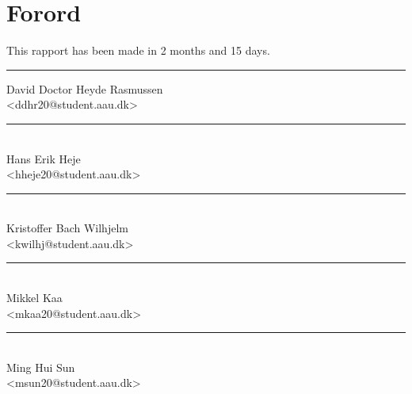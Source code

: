 \section*{Forord}%

This rapport has been made in 2 months and 15 days.

\vfill\noindent

\begin{center}
\begin{minipage}[b]{0.45\textwidth}
 \centering
 \rule{\textwidth}{0.5pt}
  David Doctor Heyde Rasmussen\\
 {\footnotesize <ddhr20@student.aau.dk>}
\end{minipage}
\end{center}

\begin{center}
\begin{minipage}[b]{0.45\textwidth}
 \centering
 \rule{\textwidth}{0.5pt}\\
  Hans Erik Heje\\
 {\footnotesize <hheje20@student.aau.dk>}
\end{minipage}
\hfill
\begin{minipage}[b]{0.45\textwidth}
 \centering
 \rule{\textwidth}{0.5pt}\\
  Kristoffer Bach Wilhjelm\\
 {\footnotesize <kwilhj@student.aau.dk>}
\end{minipage}
\vspace{3\baselineskip}
\end{center}

\begin{center}
\begin{minipage}[b]{0.45\textwidth}
 \centering
 \rule{\textwidth}{0.5pt}\\
  Mikkel Kaa\\
 {\footnotesize <mkaa20@student.aau.dk>}
\end{minipage}
\hfill
\begin{minipage}[b]{0.45\textwidth}
 \centering
 \rule{\textwidth}{0.5pt}\\
  Ming Hui Sun\\
 {\footnotesize <msun20@student.aau.dk>}
\end{minipage}
\end{center}
